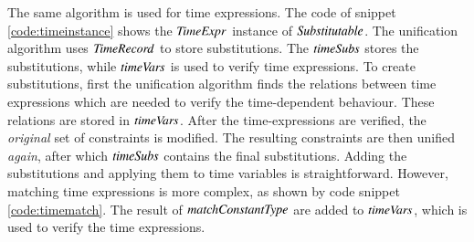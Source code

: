 The same algorithm is used for time expressions. 
The code of snippet \ref{code:timeinstance} shows the \ensuremath{\Conid{TimeExpr}} instance of \ensuremath{\Conid{Substitutable}}.
The unification algorithm uses \ensuremath{\Conid{TimeRecord}} to store substitutions.
The \ensuremath{\Varid{timeSubs}} stores the substitutions, while \ensuremath{\Varid{timeVars}} is used to verify time expressions.
To create substitutions, first the unification algorithm finds the relations between time expressions which are needed to verify the time-dependent behaviour.
These relations are stored in \ensuremath{\Varid{timeVars}}.
After the time-expressions are verified, the \textit{original} set of constraints is modified.
The resulting constraints are then unified \textit{again}, after which \ensuremath{\Varid{timeSubs}} contains the final substitutions.
Adding the substitutions and applying them to time variables is straightforward.
However, matching time expressions is more complex, as shown by code snippet \ref{code:timematch}.
The result of \ensuremath{\Varid{matchConstantType}} are added to \ensuremath{\Varid{timeVars}}, which is used to verify the time expressions.

